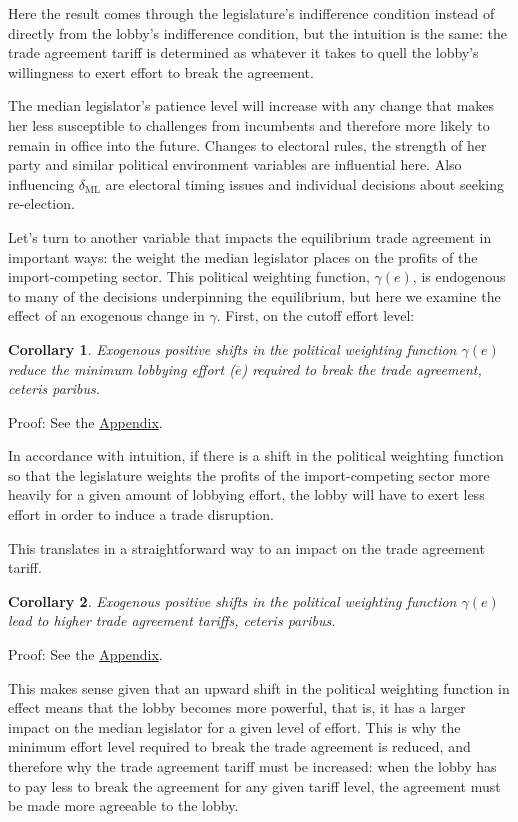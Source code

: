 \documentclass[authoryear, review]{elsarticle}
\newtheorem{corollary}{Corollary}
\newcommand{\ov}{\overline}
\newcommand{\ga}{\gamma}
\newcommand{\de}{\delta}
\begin{document}
Here the result comes through the legislature's indifference condition instead of directly from the lobby's indifference condition, but the intuition is the same: the trade agreement tariff is determined as whatever it takes to quell the lobby's willingness to exert effort to break the agreement.

The median legislator's patience level will increase with any change that makes her less susceptible to challenges from incumbents and therefore more likely to remain in office into the future. Changes to electoral rules, the strength of her party and similar political environment variables are influential here. Also influencing $\de_\text{ML}$ are electoral timing issues and individual decisions about seeking re-election.

Let's turn to another variable that impacts the equilibrium trade agreement in important ways: the weight the median legislator places on the profits of the import-competing sector. This political weighting function, $\ga(e)$, is endogenous to many of the decisions underpinning the equilibrium, but here we examine the effect of an exogenous change in $\ga$. First, on the cutoff effort level:

\begin{corollary}
  \label{cor:eg}
  Exogenous positive shifts in the political weighting function $\ga(e)$ reduce the minimum lobbying effort ($\ov{e}$) required to break the trade agreement, \emph{ceteris paribus}.

\end{corollary}

Proof: See the \hyperlink{Cor_eg}{Appendix}.

\noindent In accordance with intuition, if there is a shift in the political weighting function so that the legislature weights the profits of the import-competing sector more heavily for a given amount of lobbying effort, the lobby will have to exert less effort in order to induce a trade disruption.

This translates in a straightforward way to an impact on the trade agreement tariff.

\begin{corollary}
  Exogenous positive shifts in the political weighting function $\ga(e)$ lead to higher trade agreement tariffs, \emph{ceteris paribus}.
  \label{cor:tg}
\end{corollary}

Proof: See the \hyperlink{Cor_tg}{Appendix}.

\noindent This makes sense given that an upward shift in the political weighting function in effect means that the lobby becomes more powerful, that is, it has a larger impact on the median legislator for a given level of effort. This is why the minimum effort level required to break the trade agreement is reduced, and therefore why the trade agreement tariff must be increased: when the lobby has to pay less to break the agreement for any given tariff level, the agreement must be made more agreeable to the lobby.
\end{document}
